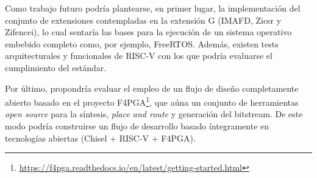 Como trabajo futuro podría plantearse, en primer lugar, la implementación del conjunto de extensiones contempladas en la extensión G (IMAFD, Zicsr y Zifencei), lo cual sentaría las bases para la ejecución de un sistema operativo embebido completo como, por ejemplo, FreeRTOS. Además, existen tests arquitecturales y funcionales de RISC-V con los que podría evaluarse el cumplimiento del estándar.

Por último, propondría evaluar el empleo de un flujo de diseño completamente abierto basado en el proyecto F4PGA\footnote{\url{https://f4pga.readthedocs.io/en/latest/getting-started.html}}, que aúna un conjunto de herramientas \textit{open source} para la síntesis, \textit{place and route} y generación del bitstream. De este modo podría construirse un flujo de desarrollo basado íntegramente en tecnologías abiertas (Chisel + RISC-V + F4PGA).